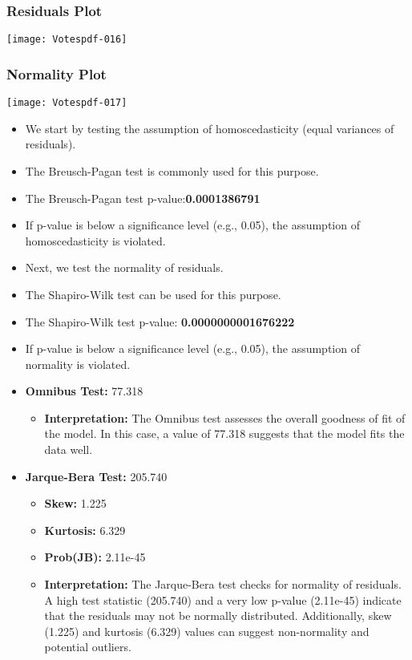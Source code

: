 \documentclass[fleqn,a4paper,12pt]{article}
\begin{document}
\subsubsection{Residuals Plot}
\texttt{[image: Votespdf-016]}

 \subsubsection{Normality Plot}
\texttt{[image: Votespdf-017]}

 
\begin{itemize}
\item We start by testing the assumption of homoscedasticity (equal variances of residuals).
\item The Breusch-Pagan test is commonly used for this purpose.
\item The Breusch-Pagan test p-value:\textbf{0.0001386791}
\item If p-value is below a significance level (e.g., 0.05), the assumption of homoscedasticity is violated.
\end{itemize}
 
 
\begin{itemize}
\item Next, we test the normality of residuals.
\item The Shapiro-Wilk test can be used for this purpose.
\item The Shapiro-Wilk test p-value: \textbf{0.0000000001676222}
\item If p-value is below a significance level (e.g., 0.05), the assumption of normality is violated.
\end{itemize}
 
 
\begin{itemize}
\item \textbf{Omnibus Test:} 77.318
  \begin{itemize}
  \item \textbf{Interpretation:} The Omnibus test assesses the overall goodness of fit of the model. In this case, a value of 77.318 suggests that the model fits the data well.
  \end{itemize}
    
\item \textbf{Jarque-Bera Test:} 205.740
  \begin{itemize}
  \item \textbf{Skew:} 1.225
  \item \textbf{Kurtosis:} 6.329
  \item \textbf{Prob(JB):} 2.11e-45
  \item \textbf{Interpretation:} The Jarque-Bera test checks for normality of residuals. A high test statistic (205.740) and a very low p-value (2.11e-45) indicate that the residuals may not be normally distributed. Additionally, skew (1.225) and kurtosis (6.329) values can suggest non-normality and potential outliers.
  \end{itemize}
\end{itemize}
 
\end{document}
